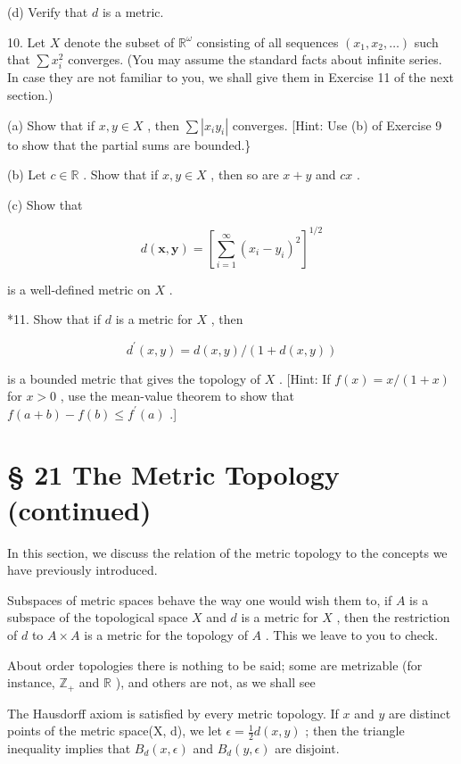 (d) Verify that \(d\) is a metric.

10. Let \(X\) denote the subset of \({\mathbb{R}}^{\omega }\) consisting of all sequences \(\left( {{x}_{1},{x}_{2},\ldots }\right)\) such that \(\sum {x}_{i}^{2}\) converges. (You may assume the standard facts about infinite series. In case they are not familiar to you, we shall give them in Exercise 11 of the next section.)

(a) Show that if \(x,y \in  X\) , then \(\sum \left| {{x}_{i}{y}_{i}}\right|\) converges. [Hint: Use (b) of Exercise 9 to show that the partial sums are bounded.\}

(b) Let \(c \in  \mathbb{R}\) . Show that if \(x,y \in  X\) , then so are \(x + y\) and \({cx}\) .

(c) Show that

\[
d\left( {\mathbf{x},\mathbf{y}}\right)  = {\left\lbrack  \mathop{\sum }\limits_{{i = 1}}^{\infty }{\left( {x}_{i} - {y}_{i}\right) }^{2}\right\rbrack  }^{1/2}
\]

is a well-defined metric on \(X\) .

*11. Show that if \(d\) is a metric for \(X\) , then

\[
{d}^{\prime }\left( {x,y}\right)  = d\left( {x,y}\right) /\left( {1 + d\left( {x,y}\right) }\right)
\]

is a bounded metric that gives the topology of \(X\) . [Hint: If \(f\left( x\right)  = x/\left( {1 + x}\right)\) for \(x > 0\) , use the mean-value theorem to show that \(f\left( {a + b}\right)  - f\left( b\right)  \leq  {f}^{\prime }\left( a\right)\) .]

\section*{§ 21 The Metric Topology (continued)}

In this section, we discuss the relation of the metric topology to the concepts we have previously introduced.

Subspaces of metric spaces behave the way one would wish them to, if \(A\) is a subspace of the topological space \(X\) and \(d\) is a metric for \(X\) , then the restriction of \(d\) to \(A \times  A\) is a metric for the topology of \(A\) . This we leave to you to check.

About order topologies there is nothing to be said; some are metrizable (for instance, \({\mathbb{Z}}_{ + }\) and \(\mathbb{R}\) ), and others are not, as we shall see

The Hausdorff axiom is satisfied by every metric topology. If \(x\) and \(y\) are distinct points of the metric space(X, d), we let \(\epsilon  = \frac{1}{2}d\left( {x,y}\right)\) ; then the triangle inequality implies that \({B}_{d}\left( {x,\epsilon }\right)\) and \({B}_{d}\left( {y,\epsilon }\right)\) are disjoint.

